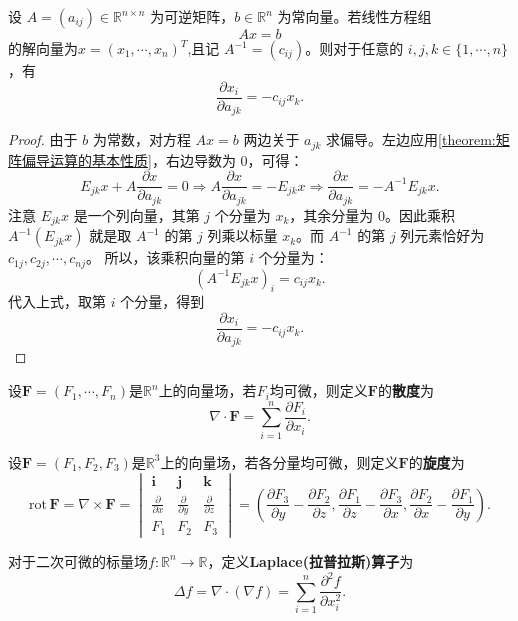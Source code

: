 \documentclass[../../main.tex]{subfiles}%
\begin{document}
\begin{example}
设 \(A = (a_{ij}) \in \mathbb{R}^{n \times n}\) 为可逆矩阵，\(b \in \mathbb{R}^{n}\) 为常向量。若线性方程组
\[
Ax = b
\]
的解向量为\(x = (x_1, \cdots, x_n)^T\),且记 \(A^{-1} = (c_{ij})\)。则对于任意的 \(i, j, k \in \{1, \cdots, n\}\)，有
\[
\frac{\partial x_i}{\partial a_{jk}} = -c_{ij} x_k.
\]
\end{example}
\begin{proof}
由于 \(b\) 为常数，对方程 \(Ax = b\) 两边关于 \(a_{jk}\) 求偏导。左边应用\cref{theorem:矩阵偏导运算的基本性质}，右边导数为 \(0\)，可得：
\[
E_{jk} x + A \frac{\partial x}{\partial a_{jk}} = 0\Longrightarrow A \frac{\partial x}{\partial a_{jk}} = -E_{jk} x\Longrightarrow \frac{\partial x}{\partial a_{jk}} = -A^{-1} E_{jk} x.
\]
注意 \(E_{jk} x\) 是一个列向量，其第 \(j\) 个分量为 \(x_k\)，其余分量为 \(0\)。因此乘积 \(A^{-1} (E_{jk} x)\) 就是取 \(A^{-1}\) 的第 \(j\) 列乘以标量 \(x_k\)。而 \(A^{-1}\) 的第 \(j\) 列元素恰好为 \(c_{1j}, c_{2j}, \cdots, c_{nj}\)。
所以，该乘积向量的第 \(i\) 个分量为：
\[
\left( A^{-1} E_{jk} x \right)_i = c_{ij} x_k.
\]
代入上式，取第 \(i\) 个分量，得到
\[
\frac{\partial x_i}{\partial a_{jk}} = -c_{ij} x_k.
\]\end{proof}

\begin{definition}
设$\bm{F}=(F_1,\cdots,F_n)$是$\mathbb{R}^n$上的向量场，若$F_i$均可微，则定义$\bm{F}$的\textbf{散度}为
\[
\nabla\cdot\bm{F}=\sum_{i=1}^{n}\frac{\partial F_i}{\partial x_i}.
\]
\end{definition}

\begin{definition}
设$\bm{F}=(F_1,F_2,F_3)$是$\mathbb{R}^3$上的向量场，若各分量均可微，则定义$\bm{F}$的\textbf{旋度}为
\[
\mathrm{rot}\,\boldsymbol{F}=\nabla\times\bm{F}=
\begin{vmatrix}
\bm{i} & \bm{j} & \bm{k} \\
\frac{\partial}{\partial x} & \frac{\partial}{\partial y} & \frac{\partial}{\partial z} \\
F_1 & F_2 & F_3
\end{vmatrix}
=\left(\frac{\partial F_3}{\partial y}-\frac{\partial F_2}{\partial z},\frac{\partial F_1}{\partial z}-\frac{\partial F_3}{\partial x},\frac{\partial F_2}{\partial x}-\frac{\partial F_1}{\partial y}\right).
\]
\end{definition}

\begin{definition}
对于二次可微的标量场$f:\mathbb{R}^n\to\mathbb{R}$，定义\textbf{Laplace(拉普拉斯)算子}为
\[
\Delta f=\nabla\cdot(\nabla f)=\sum_{i=1}^{n}\frac{\partial^{2}f}{\partial x_i^{2}}.
\]
\end{definition}
\end{document}
